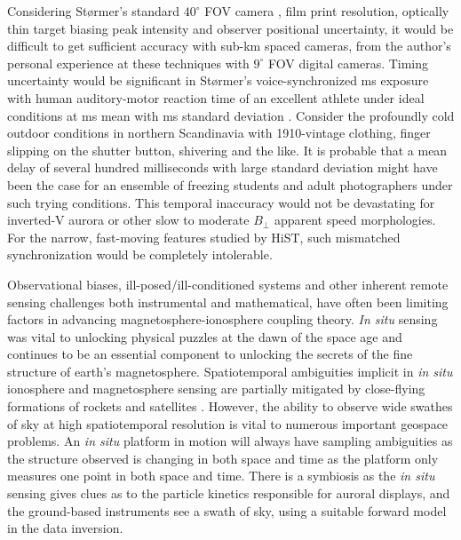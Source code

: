 Considering Størmer's standard $40^\circ$ FOV camera \citep{egeland2013}, film print resolution, optically thin target biasing peak intensity and observer positional uncertainty, it would be difficult to get sufficient accuracy with sub-\unit[5]{km} spaced cameras, from the author's personal experience at these techniques with $9^\circ$ FOV digital cameras.
Timing uncertainty would be significant in Størmer's voice-synchronized \unit[200]{ms} exposure with human auditory-motor reaction time of an excellent athlete under ideal conditions at \unit[82]{ms} mean with \unit[17]{ms} standard deviation \citep{pain2007}.
Consider the profoundly cold outdoor conditions in northern Scandinavia with 1910-vintage clothing, finger slipping on the shutter button, shivering and the like.
It is probable that a mean delay of several hundred milliseconds with large standard deviation might have been the case for an ensemble of freezing students and adult photographers under such trying conditions.
This temporal inaccuracy would not be devastating for inverted-V aurora or other slow to moderate $B_\perp$ apparent speed morphologies.
For the narrow, fast-moving features studied by HiST, such mismatched synchronization would be completely intolerable.


Observational biases, ill-posed/ill-conditioned systems and other inherent remote sensing challenges both instrumental and mathematical, have often been limiting factors in advancing magnetosphere-ionosphere coupling theory.
\textit{In situ} sensing was vital to unlocking physical puzzles at the dawn of the space age and continues to be an essential component to unlocking the secrets of the fine structure of earth's magnetosphere.
Spatiotemporal ambiguities implicit in \textit{in situ} ionosphere and magnetosphere sensing are partially mitigated by close-flying formations of rockets \citep{lynch2012} and satellites \citep{parham2016}.
However, the ability to observe wide swathes of sky at high spatiotemporal resolution is vital to numerous important geospace problems.
An \textit{in situ} platform in motion will always have sampling ambiguities as the structure observed is changing in both space and time as the platform only measures one point in both space and time. 
There is a symbiosis as the \textit{in situ} sensing gives clues as to the particle kinetics responsible for auroral displays, and the ground-based instruments see a swath of sky, using a suitable forward model in the data inversion.

